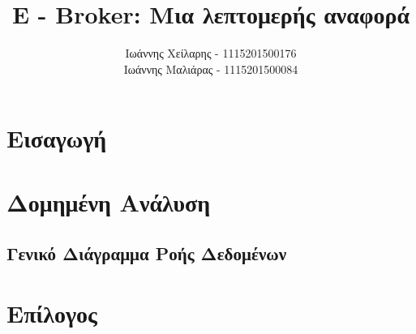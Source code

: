 \documentclass{article}
\begin{document}
\title{E - Broker: Μια λεπτομερής αναφορά}
\author{
	Ιωάννης Χείλαρης - 1115201500176
	\\
	Ιωάννης Μαλιάρας - 1115201500084
}

\maketitle

\newpage
\tableofcontents


\newpage
\section{Εισαγωγή}
	
	
\newpage
\section{Δομημένη Ανάλυση}
	\subsection{Γενικό Διάγραμμα Ροής Δεδομένων}
	\subsection{}

\newpage
\section{Επίλογος}
\end{document}
